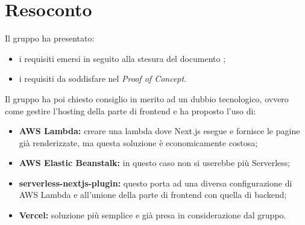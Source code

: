 \section{Resoconto}
Il gruppo ha presentato:
\begin{itemize}
\item i requisiti emersi in seguito alla stesura del documento ;
\item i requisiti da soddisfare nel \textit{Proof of Concept}. 
\end{itemize}
Il gruppo ha poi chiesto consiglio in merito ad un dubbio tecnologico, ovvero come gestire l'hosting della parte di frontend e \Proponente{} ha proposto l'uso di:
\begin{itemize}
\item \textbf{AWS Lambda:} creare una lambda dove Next.js esegue e fornisce le pagine già renderizzate, ma questa soluzione è economicamente costosa;
\item \textbf{AWS Elastic Beanstalk:} in questo caso non si userebbe più Serverless;
\item \textbf{serverless-nextjs-plugin:} questo porta ad una diversa configurazione di AWS Lambda e all'unione della parte di frontend con quella di backend;
\item \textbf{Vercel:} soluzione più semplice e già presa in considerazione dal gruppo.
\end{itemize}



